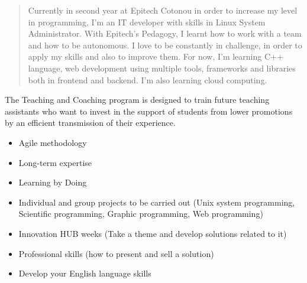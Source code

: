 \documentclass[10pt,a4paper,ragged2e,withhyper]{altacv}
\begin{document}

\makecvheader


\begin{paracol}{2}

\begin{quote}
Currently in second year at Epitech Cotonou in order to increase my level in programming, I'm an IT developer with skills in Linux System Administrator. With Epitech's Pedagogy, I learnt how to work with a team and how to be autonomous. I love to be constantly in challenge, in order to apply my skills and also to improve them. For now, I'm learning C++ language, web development using multiple tools, frameworks and libraries both in frontend and backend.  I'm also learning cloud computing.
\end{quote}


The Teaching and Coaching program is designed to train future teaching assistants who want to invest in the support of students from lower promotions by an efficient transmission of their experience.\\
\divider

\begin{itemize}
\item Agile methodology
\item Long-term expertise
\item Learning by Doing
\item Individual and group projects to be carried out (Unix system programming, Scientific programming, Graphic programming, Web programming)
\item Innovation HUB weeks (Take a theme and develop solutions related to it)
\item Professional skills (how to present and sell a solution)
\item Develop your English language skills
\end{itemize}


\end{paracol}
\end{document}
